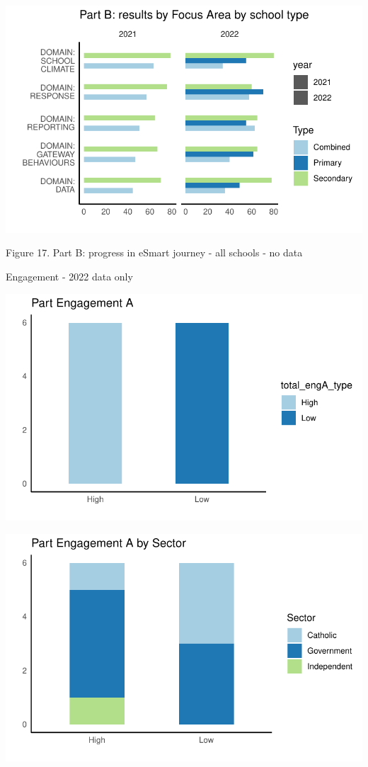 \documentclass[
  letterpaper,
  DIV=11,
  numbers=noendperiod]{scrartcl}
\begin{document}
\includegraphics{report_files/figure-pdf/unnamed-chunk-18-2.pdf}

Figure 17. Part B: progress in eSmart journey - all schools - no data

Engagement - 2022 data only

\includegraphics{report_files/figure-pdf/unnamed-chunk-19-1.pdf}

\includegraphics{report_files/figure-pdf/unnamed-chunk-19-2.pdf}
\end{document}
